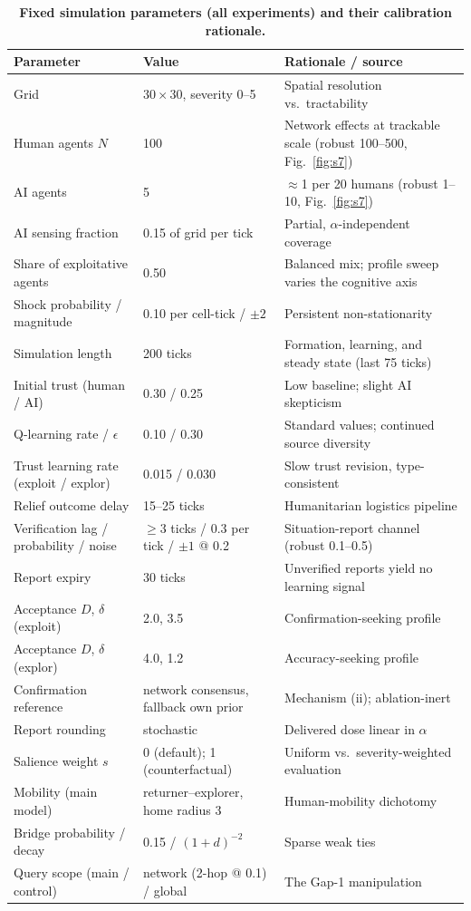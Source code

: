 \documentclass[11pt]{article}
\begin{document}
\begin{table}[h!]
\centering
\caption{\textbf{Fixed simulation parameters (all experiments) and their
calibration rationale.}}\label{tab:s7-params}
\footnotesize
\begin{tabular}{@{}lll@{}}
\toprule
Parameter & Value & Rationale / source \\
\midrule
Grid & $30 \times 30$, severity 0--5 & Spatial resolution vs.\ tractability \\
Human agents $N$ & 100 & Network effects at trackable scale (robust 100--500, Fig.~\ref{fig:s7}) \\
AI agents & 5 & $\approx$1 per 20 humans (robust 1--10, Fig.~\ref{fig:s7}) \\
AI sensing fraction & 0.15 of grid per tick & Partial, $\alpha$-independent coverage \\
Share of exploitative agents & 0.50 & Balanced mix; profile sweep varies the cognitive axis \\
Shock probability / magnitude & 0.10 per cell-tick / $\pm 2$ & Persistent non-stationarity \\
Simulation length & 200 ticks & Formation, learning, and steady state (last 75 ticks) \\
Initial trust (human / AI) & 0.30 / 0.25 & Low baseline; slight AI skepticism \\
Q-learning rate / $\epsilon$ & 0.10 / 0.30 & Standard values; continued source diversity \\
Trust learning rate (exploit / explor) & 0.015 / 0.030 & Slow trust revision, type-consistent \\
Relief outcome delay & 15--25 ticks & Humanitarian logistics pipeline \\
Verification lag / probability / noise & $\geq 3$ ticks / 0.3 per tick / $\pm 1$ @ 0.2 & Situation-report channel (robust 0.1--0.5) \\
Report expiry & 30 ticks & Unverified reports yield no learning signal \\
Acceptance $D$, $\delta$ (exploit) & 2.0, 3.5 & Confirmation-seeking profile \\
Acceptance $D$, $\delta$ (explor) & 4.0, 1.2 & Accuracy-seeking profile \\
Confirmation reference & network consensus, fallback own prior & Mechanism (ii); ablation-inert \\
Report rounding & stochastic & Delivered dose linear in $\alpha$ \\
Salience weight $s$ & 0 (default); 1 (counterfactual) & Uniform vs.\ severity-weighted evaluation \\
Mobility (main model) & returner--explorer, home radius 3 & Human-mobility dichotomy \citep{pappalardo2015returners} \\
Bridge probability / decay & 0.15 / $(1+d)^{-2}$ & Sparse weak ties \citep{granovetter1973strength} \\
Query scope (main / control) & network (2-hop @ 0.1) / global & The Gap-1 manipulation \\
\bottomrule
\end{tabular}
\end{table}
\end{document}
